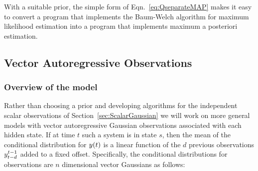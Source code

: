 With a suitable prior, the simple form of Eqn.~\eqref{eq:QseparateMAP}
makes it easy to convert a program that implements the Baum-Welch
algorithm for  maximum likelihood
estimation into a program that implements maximum a posteriori
estimation.

\subsection{Vector Autoregressive Observations}
\label{sec:ARVGaussian}

\subsubsection{Overview of the model}

Rather than choosing a prior and developing algorithms for the
independent scalar observations of Section~\ref{sec:ScalarGaussian} we will
work on more general models with vector autoregressive Gaussian
observations associated with each hidden state.  If at time $t$ such a
system is in state $s$, then the mean of the conditional distribution
for ${y}{(t)}$ is a linear function of the $d$ previous observations
$y_{t-d}^{t-1}$ added to a fixed offset.  Specifically, the
conditional distributions for observations are $n$ dimensional vector
Gaussians as follows:
